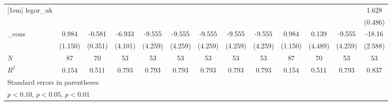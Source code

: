 {\begin{tabular}{l*{12}{c}}
[1em]
legor\_uk    &                     &                     &                     &                     &                     &                     &                     &                     &                     &                     &                     &       1.628\sym{**} \\
            &                     &                     &                     &                     &                     &                     &                     &                     &                     &                     &                     &     (0.486)         \\
[1em]
\_cons      &       0.984         &      -0.581         &      -6.933         &      -9.555\sym{*}  &      -9.555\sym{*}  &      -9.555\sym{*}  &      -9.555\sym{*}  &      -9.555\sym{*}  &       0.984         &       0.139         &      -9.555\sym{*}  &      -18.16\sym{***}\\
            &     (1.150)         &     (0.351)         &     (4.101)         &     (4.259)         &     (4.259)         &     (4.259)         &     (4.259)         &     (4.259)         &     (1.150)         &     (4.489)         &     (4.259)         &     (2.588)         \\
\hline
\(N\)       &          87         &          70         &          53         &          53         &          53         &          53         &          53         &          53         &          87         &          70         &          53         &          53         \\
\(R^{2}\)   &       0.154         &       0.511         &       0.793         &       0.793         &       0.793         &       0.793         &       0.793         &       0.793         &       0.154         &       0.511         &       0.793         &       0.837         \\
\hline\hline
\multicolumn{13}{l}{\footnotesize Standard errors in parentheses}\\
\multicolumn{13}{l}{\footnotesize \sym{*} \(p<0.10\), \sym{**} \(p<0.05\), \sym{***} \(p<0.01\)}\\
\end{tabular}
}
